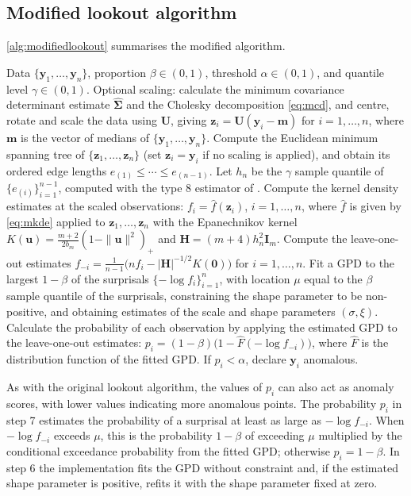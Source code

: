 \subsection{Modified lookout algorithm}

\cref{alg:modifiedlookout} summarises the modified algorithm.

\begin{algorithm}
  \caption{Modified lookout algorithm}\label{alg:modifiedlookout}
  \begin{algorithmic}[1]
    \Require Data $\{\bm{y}_1, \dots, \bm{y}_n\}$, proportion $\beta \in (0,1)$, threshold $\alpha \in (0,1)$, and quantile level $\gamma \in (0,1)$.
    \State Optional scaling: calculate the minimum covariance determinant estimate $\hat{\bm{\Sigma}}$ and the Cholesky decomposition \eqref{eq:mcd}, and centre, rotate and scale the data using $\bm{U}$, giving $\bm{z}_i = \bm{U}(\bm{y}_i - \bm{m})$ for $i = 1,\dots,n$, where $\bm{m}$ is the vector of medians of $\{\bm{y}_1,\dots,\bm{y}_n\}$.
    \State Compute the Euclidean minimum spanning tree of $\{\bm{z}_1,\dots,\bm{z}_n\}$ (set $\bm{z}_i = \bm{y}_i$ if no scaling is applied), and obtain its ordered edge lengths $e_{(1)} \le \cdots \le e_{(n-1)}$.
    \State Let $h_n$ be the $\gamma$ sample quantile of $\{ e_{(i)} \}_{i=1}^{n-1}$, computed with the type 8 estimator of \citet{HF96}.
    \State Compute the kernel density estimates at the scaled observations: $f_i = \hat{f}(\bm{z}_i)$, $i=1,\dots,n$, where $\hat{f}$ is given by \eqref{eq:mkde} applied to $\bm{z}_1,\dots,\bm{z}_n$ with the Epanechnikov kernel $K(\bm{u}) = \frac{m+2}{2b_m}(1 - \|\bm{u}\|^2)_+$ and $\bm{H} = (m+4)h_n^2\bm{I}_m$.
    \State Compute the leave-one-out estimates $f_{-i} = \frac{1}{n-1} \big( n f_i - |\bm{H}|^{-1/2} K(\bm{0}) \big)$ for $i=1,\dots,n$.
    \State Fit a GPD to the largest $1-\beta$ of the surprisals $\{-\log f_i\}_{i=1}^n$, with location $\mu$ equal to the $\beta$ sample quantile of the surprisals, constraining the shape parameter to be non-positive, and obtaining estimates of the scale and shape parameters $(\sigma, \xi)$.
    \State Calculate the probability of each observation by applying the estimated GPD to the leave-one-out estimates: $p_i = (1-\beta)\big(1 - \hat{F}(-\log f_{-i})\big)$, where $\hat{F}$ is the distribution function of the fitted GPD.
    \State If $p_i < \alpha$, declare $\bm{y}_i$ anomalous.
  \end{algorithmic}
\end{algorithm}

As with the original lookout algorithm, the values of $p_i$ can also act as anomaly scores, with lower values indicating more anomalous points. The probability $p_i$ in step 7 estimates the probability of a surprisal at least as large as $-\log f_{-i}$. When $-\log f_{-i}$ exceeds $\mu$, this is the probability $1-\beta$ of exceeding $\mu$ multiplied by the conditional exceedance probability from the fitted GPD; otherwise $p_i = 1-\beta$. In step 6 the implementation fits the GPD without constraint and, if the estimated shape parameter is positive, refits it with the shape parameter fixed at zero.

